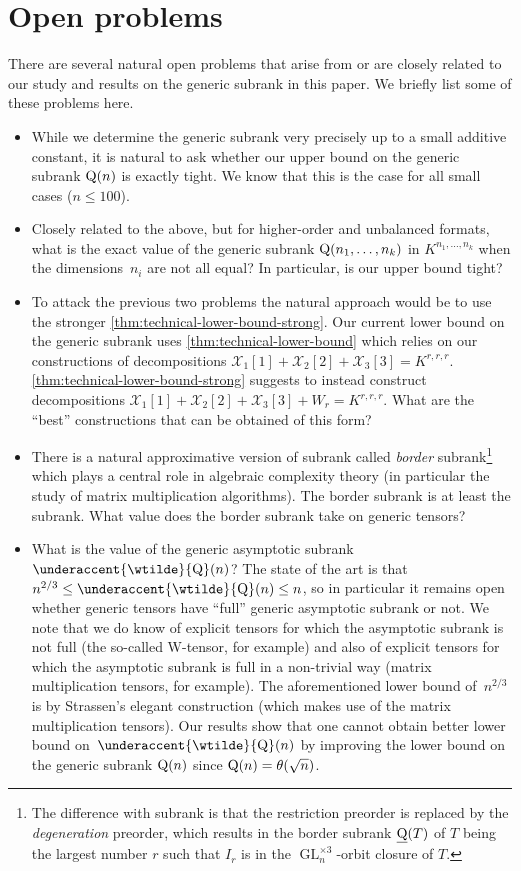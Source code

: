 \documentclass[11pt]{article}
\theoremstyle{definition}
\theoremstyle{remark}
\newcommand{\bsubrank}{{\underline{\rm Q}}}
\newcommand{\gensubrank}{{\rm Q}}
\newcommand{\GL}{\operatorname{GL}}
\DeclareMathOperator{\asympsubrank}{\underaccent{\wtilde}{Q}}
\begin{document}
\section{Open problems}\label{sec:open-problems}

There are several natural open problems that arise from or are closely related to our study and results on the generic subrank in this paper. We briefly list some of these problems here.

\begin{itemize}
    \item While we determine the generic subrank very precisely up to a small additive constant, it is natural to ask whether our upper bound on the generic subrank $\gensubrank(n)$ is exactly tight. We know that this is the case for all small cases ($n \leq 100$). %
    \item Closely related to the above, but for higher-order and unbalanced formats, what is the exact value of the generic subrank $\gensubrank(n_1,\ldots,n_k)$ in $K^{n_1,\ldots, n_k}$ when the dimensions~$n_i$ are not all equal? In particular, is our upper bound tight?
    \item To attack the previous two problems the natural approach would be to use the stronger 
    \autoref{thm:technical-lower-bound-strong}.
    Our current lower bound on the generic subrank uses \autoref{thm:technical-lower-bound} which relies on our constructions of decompositions $\mathcal{X}_1[1] + \mathcal{X}_2[2] + \mathcal{X}_3[3] = K^{r,r,r}$.  \autoref{thm:technical-lower-bound-strong} suggests to instead construct decompositions $\mathcal{X}_1[1] + \mathcal{X}_2[2] + \mathcal{X}_3[3] + W_r = K^{r,r,r}$. What are the ``best'' constructions that can be obtained of this form?
    \item There is a natural approximative version of subrank called \emph{border} subrank\footnote{The difference with subrank is that the restriction preorder is replaced by the \emph{degeneration} preorder, which results in the border subrank $\bsubrank(T)$ of $T$ being the largest number $r$ such that $I_r$ is in the $\GL_n^{\times3}$-orbit closure of $T$.} which plays a central role in algebraic complexity theory (in particular the study of matrix multiplication algorithms).
    The border subrank is at least the subrank. What value %
    does the border subrank take on generic tensors?
    \item What is the value of the generic asymptotic subrank $\asympsubrank(n)$? The state of the art is that $n^{2/3} \leq \asympsubrank(n) \leq n$, so in particular it remains open whether generic tensors have ``full'' generic asymptotic subrank or not. We note that we do know of explicit tensors for which the asymptotic subrank is not full (the so-called W-tensor, for example) and also of explicit tensors for which the asymptotic subrank is full in a non-trivial way (matrix multiplication tensors, for example). The aforementioned lower bound of~$n^{2/3}$ is by Strassen's elegant construction (which makes use of the matrix multiplication tensors). Our results show that one cannot obtain better lower bound on~$\asympsubrank(n)$ by improving the lower bound on the generic subrank $\gensubrank(n)$ since $\gensubrank(n) = \theta(\sqrt{n})$.

\end{itemize}
\end{document}
